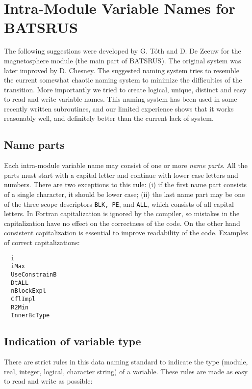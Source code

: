 \section{Intra-Module Variable Names for BATSRUS}

The following suggestions were developed by G. T\'oth and D. De Zeeuw
for the magnetosphere module (the main part of BATSRUS).
The original system was later improved by D. Chesney.
The suggested naming system tries to resemble the current somewhat chaotic 
naming system to minimize the difficulties of the transition. 
More importantly we tried to create logical, unique, distinct and easy 
to read and write variable names. This naming system has been used in 
some recently written subroutines, and our limited experience shows that
it works reasonably well, and definitely better than the current lack
of system. 

\subsection{Name parts}

Each intra-module variable name may consist of one or more {\it name parts}.
All the parts must start with a capital letter and continue
with lower case letters and numbers. There are two exceptions
to this rule: (i) if the first name part consists of a single 
character, it should be lower case; (ii) the last name
part may be one of the three scope descriptors {\tt BLK, PE}, and 
{\tt ALL}, which consists of all capital letters. 
In Fortran capitalization is ignored
by the compiler, so mistakes in the capitalization
have no effect on the correctness of the code. On the other hand
consistent capitalization is essential to improve readability of the code.
Examples of correct capitalizations:
\begin{verbatim}
  i
  iMax
  UseConstrainB
  DtALL
  nBlockExpl
  CflImpl
  R2Min
  InnerBcType
\end{verbatim}

\subsection{Indication of variable type}

There are strict rules in this data naming standard to indicate 
the type (module, real, integer, logical, character string) of 
a variable. These rules are made as easy to read and write
as possible:

